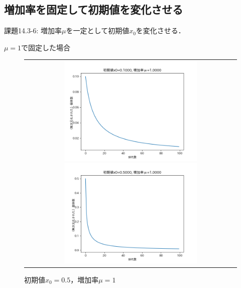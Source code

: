 \documentclass[a4paper, oneside]{jsarticle}
\begin{document}
\newpage
\subsection{増加率を固定して初期値を変化させる}

課題14.3-6: 増加率$\mu$を一定として初期値$x_0$を変化させる．

$\mu=1$で固定した場合
\begin{figure}[htpb]
  \begin{tabular}{c}
    \begin{minipage}{0.50\hsize}
      \centering
      \includegraphics[width=70mm]
        {x0_0.1000-mu_1.0000.png}
        \caption{初期値$x_0=0.1$，増加率$\mu=1$}
        \label{fig:0.1000_1.0000}
    \end{minipage}
    \begin{minipage}{0.50\hsize}
      \centering
      \includegraphics[width=70mm]
        {x0_0.5000-mu_1.0000.png}
        \caption{初期値$x_0=0.5$，増加率$\mu=1$}
        \label{fig:0.5000_1.0000}
    \end{minipage}
  \end{tabular}
\end{figure}
\end{document}
